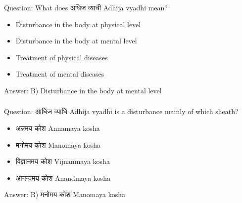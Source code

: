 %
%
%


\begin{frame}[fragile]\frametitle{}

Question: What does अधिज व्याधी Adhija vyadhi mean?

\begin{itemize}
\item[A)] Disturbance in the body at physical level
\item[B)] Disturbance in the body at mental level
\item[C)] Treatment of physical diseases
\item[D)] Treatment of mental diseases
\end{itemize}

Answer: B) Disturbance in the body at mental level
\end{frame}

\begin{frame}[fragile]\frametitle{}

Question: आधिज व्याधि Adhija vyadhi is a disturbance mainly of which sheath?

\begin{itemize}
\item[A)] अन्नमय कोश Annamaya kosha
\item[B)] मनोमय कोश Manomaya kosha
\item[C)] विज्ञानमय कोश Vijnanmaya kosha
\item[D)] आनन्दमय कोश Anandmaya kosha
\end{itemize}

Answer: B) मनोमय कोश Manomaya kosha
\end{frame}

